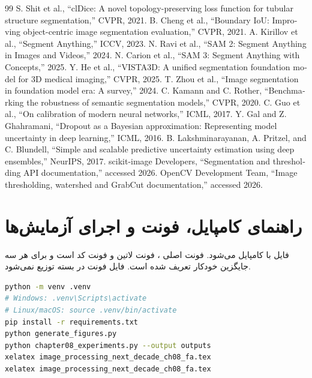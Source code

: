 \documentclass[12pt,openany,oneside]{book}
\begin{document}
\begin{latin}
\begin{thebibliography}{99}
 S. Shit et al., ``clDice: A novel topology-preserving loss function for tubular structure segmentation,'' CVPR, 2021.
 B. Cheng et al., ``Boundary IoU: Improving object-centric image segmentation evaluation,'' CVPR, 2021.
 A. Kirillov et al., ``Segment Anything,'' ICCV, 2023.
 N. Ravi et al., ``SAM 2: Segment Anything in Images and Videos,'' 2024.
 N. Carion et al., ``SAM 3: Segment Anything with Concepts,'' 2025.
 Y. He et al., ``VISTA3D: A unified segmentation foundation model for 3D medical imaging,'' CVPR, 2025.
 T. Zhou et al., ``Image segmentation in foundation model era: A survey,'' 2024.
 C. Kamann and C. Rother, ``Benchmarking the robustness of semantic segmentation models,'' CVPR, 2020.
 C. Guo et al., ``On calibration of modern neural networks,'' ICML, 2017.
 Y. Gal and Z. Ghahramani, ``Dropout as a Bayesian approximation: Representing model uncertainty in deep learning,'' ICML, 2016.
 B. Lakshminarayanan, A. Pritzel, and C. Blundell, ``Simple and scalable predictive uncertainty estimation using deep ensembles,'' NeurIPS, 2017.
 scikit-image Developers, ``Segmentation and thresholding API documentation,'' accessed 2026.
 OpenCV Development Team, ``Image thresholding, watershed and GrabCut documentation,'' accessed 2026.
\end{thebibliography}
\end{latin}

\chapter*{راهنمای کامپایل، فونت و اجرای آزمایش‌ها}
فایل با  کامپایل می‌شود. فونت اصلی ، فونت لاتین  و فونت کد
 است و برای هر سه جایگزین خودکار تعریف شده است. فایل فونت در بسته توزیع نمی‌شود.

\begin{latin}
\begin{lstlisting}[language=bash]
python -m venv .venv
# Windows: .venv\Scripts\activate
# Linux/macOS: source .venv/bin/activate
pip install -r requirements.txt
python generate_figures.py
python chapter08_experiments.py --output outputs
xelatex image_processing_next_decade_ch08_fa.tex
xelatex image_processing_next_decade_ch08_fa.tex
\end{lstlisting}
\end{latin}
\end{document}
